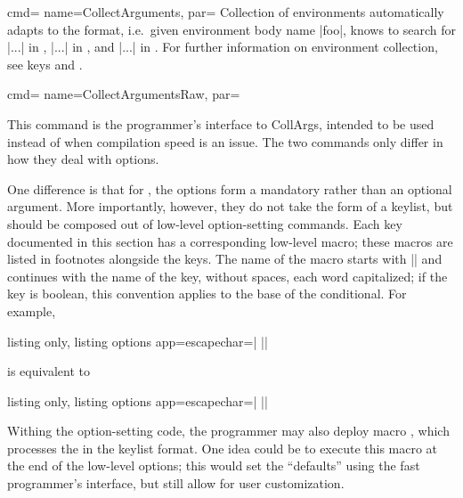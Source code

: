 \documentclass[a4paper,11pt]{article}
\begin{document}
\begin{doc}{cmd={
      name=CollectArguments,
      par=%
      \textcolor{gray}{}}}
  Collection of environments automatically adapts to the format, i.e.\ given
  environment body name |foo|,  knows to search for
   |...|  in
  ,  |...|  in , and
   |...|  in .  For further
  information on environment collection, see keys  and .
\end{doc}

\begin{doc}{cmd={
      name=CollectArgumentsRaw,
      par=%
      \textcolor{gray}{}}}
    
  This command is the programmer's interface to CollArgs, intended to be used
  instead of  when compilation speed is an issue.  The
  two commands only differ in how they deal with options.

  One difference is that for , the options form a
  mandatory rather than an optional argument.  More importantly, however, they
  do not take the form of a keylist, but should be composed out of low-level
  option-setting commands.  Each key documented in this section has a
  corresponding low-level macro; these macros are listed in footnotes alongside
  the keys.  The name of the macro starts with |\collargs| and continues with
  the name of the key, without spaces, each word capitalized; if the key is
  boolean, this convention applies to the base of the 
  conditional. For example,
  \begin{tcblisting}{listing only, listing options app={escapechar=|}}
\CollectArguments[caller=\foo, tags, verbatim]||
  \end{tcblisting}
  is equivalent to
  \begin{tcblisting}{listing only, listing options app={escapechar=|}}
\CollectArgumentsRaw{%
  \collargsCaller{\foo}%
  \collargsBeginTagtrue\collargsEndTagtrue
  \collargsVerbatim
}||
  \end{tcblisting}
  
  Withing the option-setting code, the programmer may also deploy macro
  , which processes the  in the keylist
  format.  One idea could be to execute this macro at the end of the low-level
  options; this would set the ``defaults'' using the fast programmer's
  interface, but still allow for user customization.
\end{doc}
\end{document}

